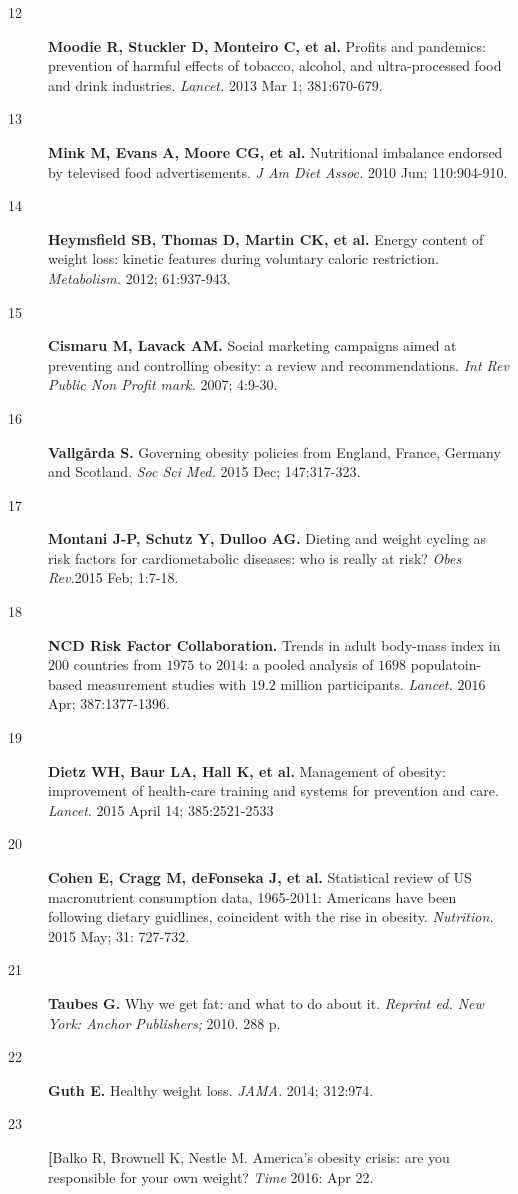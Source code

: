 \documentclass[11pt]{article}  %
\begin{document}
\begin{description}
  \item[12]\textbf{Moodie R, Stuckler D, Monteiro C, et al.} Profits and pandemics: prevention of harmful effects of tobacco, alcohol, and ultra-processed food and drink industries. \textit{Lancet.} 2013 Mar 1; 381:670-679.
  \item[13]\textbf{Mink M, Evans A, Moore CG, et al.} Nutritional imbalance endorsed by televised food advertisements. \textit{J Am Diet Assoc.} 2010 Jun; 110:904-910.
  \item[14]\textbf{Heymsfield SB, Thomas D, Martin CK, et al.} Energy content of weight loss: kinetic features during voluntary caloric restriction. \textit{Metabolism.} 2012; 61:937-943.
  \item[15]\textbf{Cismaru M, Lavack AM.} Social marketing campaigns aimed at preventing and controlling obesity: a review and recommendations. \textit{Int Rev Public Non Profit mark.} 2007; 4:9-30.
  \item[16]\textbf{Vallg\r{a}rda S.} Governing obesity policies from England, France, Germany and Scotland. \textit{Soc Sci Med.} 2015 Dec; 147:317-323.
  \item[17]\textbf{Montani J-P, Schutz Y, Dulloo AG.} Dieting and weight cycling as risk factors for cardiometabolic diseases: who is really at risk? \textit{Obes Rev.}2015 Feb; 1:7-18.
  \item[18]\textbf{NCD Risk Factor Collaboration.} Trends in adult body-mass index in $200$ countries from $1975$ to $2014$: a pooled analysis of $1698$ populatoin-based measurement studies with $19.2$ million participants. \textit{Lancet.} $2016$ Apr; 387:1377-1396.
  \item[19]\textbf{Dietz WH, Baur LA, Hall K, et al.} Management of obesity: improvement of health-care training and systems for prevention and care. \textit{Lancet}. 2015 April 14; 385:2521-2533
  \item[20]\textbf{Cohen E, Cragg M, deFonseka J, et al.} Statistical review of US macronutrient consumption data, 1965-2011: Americans have been following dietary guidlines, coincident with the rise in obesity. \textit{Nutrition.} 2015 May; 31: 727-732.
  \item[21]\textbf{Taubes G.} Why we get fat: and what to do about it. \textit{Reprint ed. New York: Anchor Publishers;} 2010. 288 p.
  \item[22]\textbf{Guth E.} Healthy weight loss. \textit{JAMA.} 2014; 312:974.
  \item[23]\textbf[{Balko R, Brownell K, Nestle M.} America's obesity crisis: are you responsible for your own weight? \textit{Time} 2016: Apr 22.

\end{description}
\end{document}
